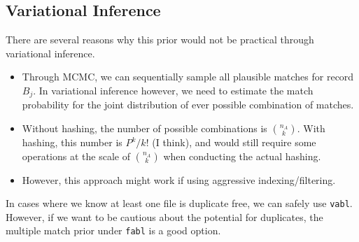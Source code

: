 \documentclass[12pt,letterpaper]{article}
\newcommand{\1}[1]{\mathbb{I}\!\left[#1\right]} %
\begin{document}
\subsection{Variational Inference}
There are several reasons why this prior would not be practical through variational inference.
\begin{itemize}
	\item Through MCMC, we can sequentially sample all plausible matches for record $B_j$. In variational inference however, we need to estimate the match probability for the joint distribution of ever possible combination of matches. 
	\item Without hashing, the number of possible combinations is $n_A \choose k$. With hashing, this number is $P^k / k!$ (I think), and would still require some operations at the scale of $n_A \choose k$ when conducting the actual hashing.
	\item However, this approach might work if using aggressive indexing/filtering.  
\end{itemize}
In cases where we know at least one file is duplicate free, we can safely use \texttt{vabl}. However, if we want to be cautious about the potential for duplicates, the multiple match prior under \texttt{fabl} is a good option. 

\end{document}
